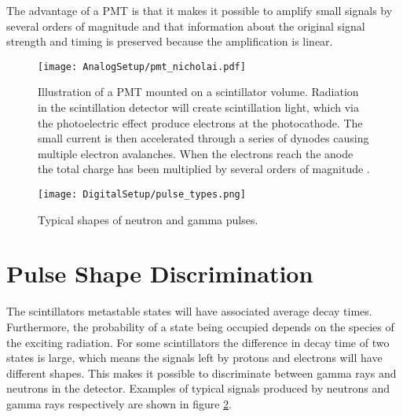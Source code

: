 \documentclass[main.tex]{subfiles}
\begin{document}
The advantage of a PMT is that it makes it possible to amplify small signals by several orders of magnitude and that information about the original signal strength and timing is preserved because the amplification is linear.

\begin{figure}[ht]
	\centering
    	\texttt{[image: AnalogSetup/pmt\_nicholai.pdf]}
        \caption[Illustration of a PMT]{Illustration of a PMT mounted on a scintillator volume. Radiation in the scintillation detector will create scintillation light, which via the photoelectric effect produce electrons at the photocathode. The small current is then accelerated through a series of dynodes causing multiple electron avalanches. When the electrons reach the anode the total charge has been multiplied by several orders of magnitude \cite{Mauritzsson}.}
	    \label{fig:pmt} 
\end{figure}

\begin{figure}[ht]
	\centering
    	\texttt{[image: DigitalSetup/pulse\_types.png]}
        \caption{Typical shapes of neutron and gamma pulses.}
	    \label{fig:pulse_types} 
\end{figure}
\section{Pulse Shape Discrimination}
The scintillators metastable states will have associated average decay times. Furthermore, the probability of a state being occupied depends on the species of the exciting radiation\cite[pg.171]{Krane}. For some scintillators the difference in decay time of two states is large, which means the signals left by protons and electrons will have different shapes. This makes it possible to discriminate between gamma rays and neutrons in the detector. Examples of typical signals produced by neutrons and gamma rays respectively are shown in figure \ref{fig:pulse_types}.
\end{document}
